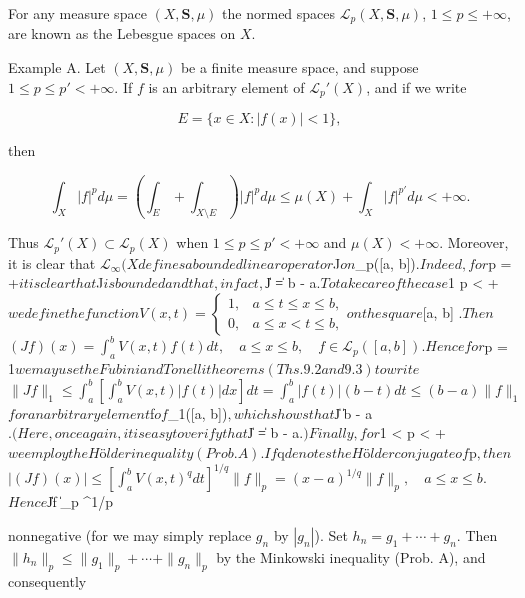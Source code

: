 For any measure space $(X, \mathbf{S}, \mu)$ the normed spaces $\mathcal{L}_p(X, \mathbf{S}, \mu)$, $1 \leq p \leq +\infty$, are known as the Lebesgue spaces on $X$.

Example A. Let $(X, \mathbf{S}, \mu)$ be a finite measure space, and suppose $1 \leq p \leq p' < +\infty$. If $f$ is an arbitrary element of $\mathcal{L}_p'(X)$, and if we write

$$E = \{x \in X : |f(x)| < 1\},$$

then

$$\int_X |f|^p d\mu = \left( \int_E + \int_{X \setminus E} \right) |f|^p d\mu \leq \mu(X) + \int_X |f|^{p'} d\mu < +\infty.$$

Thus $\mathcal{L}_p'(X) \subset \mathcal{L}_p(X)$ when $1 \leq p \leq p' < +\infty$ and $\mu(X) < +\infty$. Moreover, it is clear that $\mathcal{L}_\infty(X

defines a bounded linear operator $J$ on $_p([a, b])$. Indeed, for $p = +\infty$ it is clear that $J$ is bounded and that, in fact, $\| J \| = b - a$. To take care of the case $1 \leq p < +\infty$ we define the function

$$V(x, t) = \begin{cases} 1, & a \leq t \leq x \leq b, \\ 0, & a \leq x < t \leq b, \end{cases}$$

on the square $[a, b] \times [a, b]$. Then

$$(Jf)(x) = \int_a^b V(x, t) f(t) dt, \quad a \leq x \leq b, \quad f \in \mathcal{L}_p([a, b]).$$

Hence for $p = 1$ we may use the Fubini and Tonelli theorems (Ths. 9.2 and 9.3) to write

$$\| Jf \|_1 \leq \int_a^b \left[ \int_a^b V(x, t) |f(t)| dx \right] dt = \int_a^b |f(t)| (b - t) dt \leq (b - a) \| f \|_1$$

for an arbitrary element $f$ of $_1([a, b])$, which shows that $\| J \| \leq b - a$. (Here, once again, it is easy to verify that $\| J \| = b - a.$) Finally, for $1 < p < +\infty$ we employ the Hölder inequality (Prob. A). If $q$ denotes the Hölder conjugate of $p$, then

$$|(Jf)(x)| \leq \left[ \int_a^b V(x, t)^q dt \right]^{1/q} \| f \|_p = (x - a)^{1/q} \| f \|_p, \quad a \leq x \leq b.$$

Hence $\| Jf \|_p \leq {}^{1/p}

nonnegative (for we may simply replace $g_n$ by $|g_n|$). Set $h_n = g_1 + \cdots + g_n$.
Then $\|h_n\|_p \leq \|g_1\|_p + \cdots + \|g_n\|_p$ by the Minkowski inequality (Prob. A), and consequently

